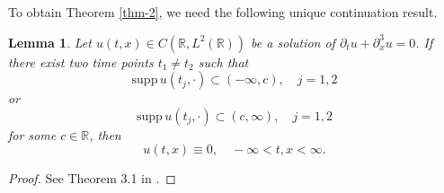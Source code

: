 \documentclass[12pt]{amsart}
\def\R {\mathbb{R}}
\newtheorem{lemma}[proposition]{Lemma}
\theoremstyle{definition}
\numberwithin{equation}{section}
\begin{document}
To obtain Theorem \ref{thm-2}, we need the following unique continuation result.
\begin{lemma}\label{lem-ucp}
    Let $u(t,x)\in C(\R, L^2(\R))$ be a  solution of $\partial_tu+\partial_x^3u=0$. If there exist two time points $t_1\neq t_2$ such that
    \begin{equation}
        \mathrm{supp }\, u(t_j,\cdot)\subset (-\infty,c),\quad j=1,2
    \end{equation}
    or
    \begin{equation}
        \mathrm{supp }\, u(t_j,\cdot)\subset (c,\infty),\quad j=1,2
    \end{equation}
    for some $c\in \R$, then
    $$
        u(t,x)\equiv 0,\quad -\infty <t,x<\infty.
    $$
\end{lemma}
\begin{proof}
See Theorem 3.1 in \cite[p.~60]{zhang-kdv}.
\end{proof}
\end{document}
